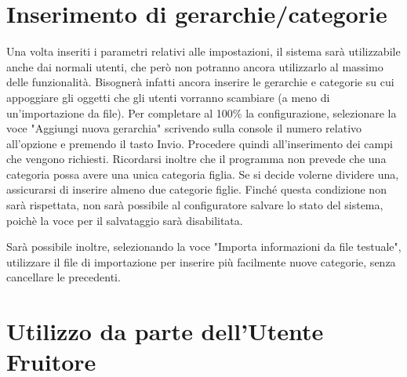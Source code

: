 \section{Inserimento di gerarchie/categorie}
Una volta inseriti i parametri relativi alle impostazioni, il sistema sarà utilizzabile anche dai normali utenti, che però non potranno ancora utilizzarlo al massimo delle funzionalità.
Bisognerà infatti ancora inserire le gerarchie e categorie su cui appoggiare gli oggetti che gli utenti vorranno scambiare (a meno di un'importazione da file).
Per completare al 100\% la configurazione, selezionare la voce "Aggiungi nuova gerarchia" scrivendo sulla console il numero relativo all'opzione e premendo il tasto Invio.
Procedere quindi all'inserimento dei campi che vengono richiesti.
Ricordarsi inoltre che il programma non prevede che una categoria possa avere una unica categoria figlia. Se si decide volerne dividere una, assicurarsi di inserire almeno due categorie figlie.
Finché questa condizione non sarà rispettata, non sarà possibile al configuratore salvare lo stato del sistema, poichè la voce per il salvataggio sarà disabilitata.

Sarà possibile inoltre, selezionando la voce "Importa informazioni da file testuale", utilizzare il file di importazione per inserire più facilmente nuove categorie, senza cancellare le precedenti.

\section{Utilizzo da parte dell'Utente Fruitore}
